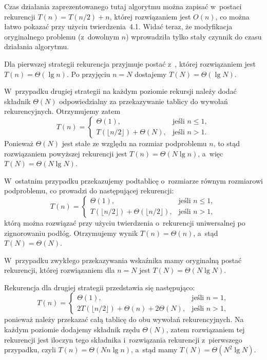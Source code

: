 Czas działania zaprezentowanego tutaj algorytmu można zapisać w~postaci rekurencji $T(n)=T(n/2)+n$, której rozwiązaniem jest $O(n)$, co można łatwo pokazać przy użyciu twierdzenia~4.1. Widać teraz, że modyfikacja oryginalnego problemu (z~dowolnym $n$) wprowadziła tylko stały czynnik do czasu działania algorytmu.


\subproblem %
Dla pierwszej strategii rekurencja przyjmuje postać z~, której rozwiązaniem jest $T(n)=\Theta(\lg n)$. Po przyjęciu $n=N$ dostajemy $T(N)=\Theta(\lg N)$.

W~przypadku drugiej strategii na każdym poziomie rekursji należy dodać składnik $\Theta(N)$ odpowiedzialny za przekazywanie tablicy do wywołań rekurencyjnych. Otrzymujemy zatem
\[
	T(n) = \begin{cases}
		\Theta(1), & \text{jeśli $n\le1$}, \\
		T(\lfloor n/2\rfloor)+\Theta(N), & \text{jeśli $n>1$}.
	\end{cases}
\]
Ponieważ $\Theta(N)$ jest stałe ze względu na rozmiar podproblemu $n$, to stąd rozwiązaniem powyższej rekurencji jest $T(n)=\Theta(N\lg n)$, a~więc $T(N)=\Theta(N\lg N)$.

W~ostatnim przypadku przekazujemy podtablicę o~rozmiarze równym rozmiarowi podproblemu, co prowadzi do następującej rekurencji:
\[
	T(n) = \begin{cases}
		\Theta(1), & \text{jeśli $n\le1$}, \\
		T(\lfloor n/2\rfloor)+\Theta(\lfloor n/2\rfloor), & \text{jeśli $n>1$},
	\end{cases}
\]
którą można rozwiązać przy użyciu twierdzenia o~rekurencji uniwersalnej po zignorowaniu podłóg. Otrzymujemy wynik $T(n)=\Theta(n)$, a~stąd $T(N)=\Theta(N)$.

\subproblem %
W~przypadku zwykłego przekazywania wskaźnika mamy oryginalną postać rekurencji, której rozwiązaniem dla $n=N$ jest $T(N)=\Theta(N\lg N)$.

Rekurencja dla drugiej strategii przedstawia się następująco:
\[
	T(n) = \begin{cases}
		\Theta(1), & \text{jeśli $n=1$}, \\
		2T(\lfloor n/2\rfloor)+\Theta(n)+2\Theta(N), & \text{jeśli $n>1$},
	\end{cases}
\]
ponieważ należy przekazać całą tablicę do obu wywołań rekurencyjnych. Na każdym poziomie dodajemy składnik rzędu $\Theta(N)$, zatem rozwiązaniem tej rekurencji jest iloczyn tego składnika i~rozwiązania rekurencji z~pierwszego przypadku, czyli $T(n)=\Theta(Nn\lg n)$, a~stąd mamy $T(N)=\Theta(N^2\lg N)$.

